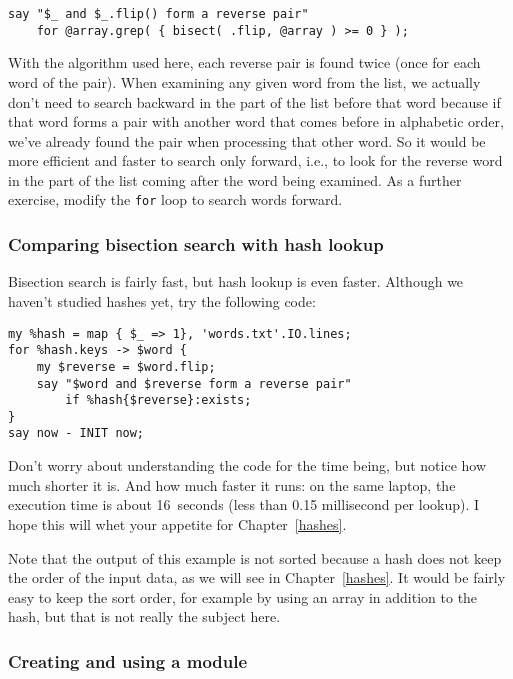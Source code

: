 \begin{verbatim}
say "$_ and $_.flip() form a reverse pair" 
    for @array.grep( { bisect( .flip, @array ) >= 0 } );
\end{verbatim}

With the algorithm used here, each reverse pair is found 
twice (once for each word of the pair). When examining 
any given word from the list, we actually don't need to 
search backward in the part of the list before that word because 
if that word forms a pair with another word that comes before in 
alphabetic order, we've already found the pair when 
processing that other word. So it would be more efficient and 
faster to search only forward, i.e., to look for the reverse 
word in the part of the list coming after the word being 
examined. As a further exercise, modify the {\tt for} loop 
to search words forward.

\subsubsection{Comparing bisection search with hash lookup}

Bisection search is fairly fast, but hash lookup is 
even faster. Although we haven't studied hashes yet, 
try the following code:

\begin{verbatim}
my %hash = map { $_ => 1}, 'words.txt'.IO.lines;
for %hash.keys -> $word {
    my $reverse = $word.flip;
    say "$word and $reverse form a reverse pair" 
        if %hash{$reverse}:exists;
}
say now - INIT now;
\end{verbatim}

Don't worry about understanding the code for the time 
being, but notice how much shorter it is. And how much 
faster it runs: on the same laptop, the execution time is 
about 16~seconds (less than 0.15 millisecond per lookup). 
I hope this will whet your appetite for Chapter~\ref{hashes}.

Note that the output of this example is not sorted because 
a hash does not keep the order of the input data, as we 
will see in Chapter~\ref{hashes}. It would be fairly easy to 
keep the sort order, for example by using an array in 
addition to the hash, but that is not really the 
subject here.

\subsubsection{Creating and using a module}

